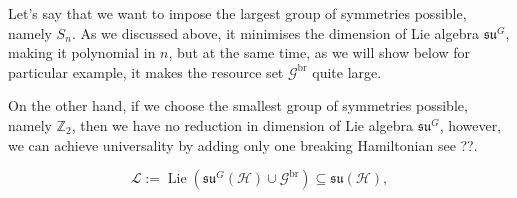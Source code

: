 \documentclass[twocolumn,superscriptaddress,aps,showpacs,amsmath,amstex,amssymb,citeautoscript,floatfix,pra,preprintnumbers]{revtex4-2}
\newcounter{alg}
\theoremstyle{plain}
\theoremstyle{plain}
\theoremstyle{plain}
\theoremstyle{plain}
\theoremstyle{plain}
\theoremstyle{plain}
\begin{document}
Let's say that we want to impose the largest group of symmetries possible, namely $S_n$. 
As we discussed above, it minimises the dimension of Lie algebra $\mathfrak{su}^G$,
making it polynomial in $n$, but at the same time, as we will show below for particular example, it makes the resource set $\mathcal{G}^{\text{br}}$ quite large.

On the other hand, if we choose the smallest group of symmetries possible, namely $\mathbb{Z}_2$, then we have no reduction in dimension of Lie algebra $\mathfrak{su}^G$,
however, we can achieve universality by adding only one breaking Hamiltonian see ??.

\[
\mathcal{L}:=\operatorname{Lie}\left(\mathfrak{su}^G(\mathcal{H}) \cup \mathcal{G}^{\text{br}}\right) \subseteq \mathfrak{su}(\mathcal{H}),
\]


 
 
\end{document}
